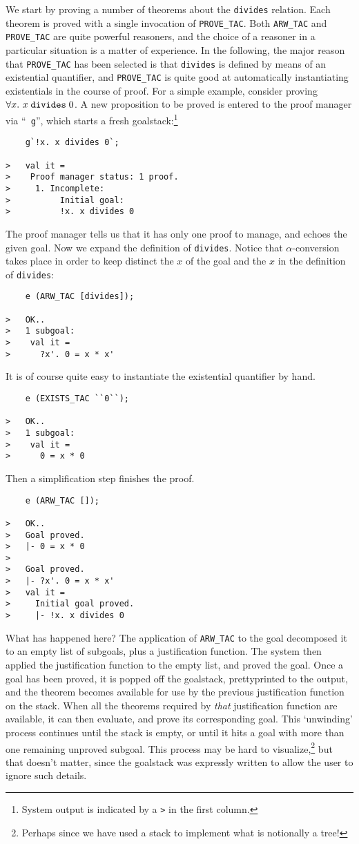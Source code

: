 We start by proving a number of theorems about the \verb+divides+
relation. Each theorem is proved with a single invocation of
\verb+PROVE_TAC+. Both 
\verb+ARW_TAC+ and \verb+PROVE_TAC+ are quite powerful reasoners, and
the choice of a reasoner in a particular situation is a matter of
experience. In the following, the major reason that \verb+PROVE_TAC+ has
been selected is that \verb+divides+ is defined by means of an existential
quantifier, and \verb+PROVE_TAC+ is quite good at automatically
instantiating existentials in the course of proof. For a simple example,
consider proving $\forall x.\ x\; \mbox{\tt divides}\; 0$. A new
proposition to be proved is entered to the proof manager via ``{\tt
g}'', which starts a fresh goalstack:\footnote{System output is indicated
by a \verb+>+ in the first column.}
{\small\begin{verbatim}
    g`!x. x divides 0`;

>   val it =
>    Proof manager status: 1 proof.
>     1. Incomplete:
>          Initial goal:
>          !x. x divides 0
\end{verbatim}}
The proof manager tells us that it has only one proof to manage, and
echoes the given goal. Now we expand the definition of
\verb+divides+. Notice that $\alpha$-conversion takes place in order to
keep distinct the $x$ of the goal and the $x$ in the definition of
\verb+divides+:
{\small\begin{verbatim}
    e (ARW_TAC [divides]);

>   OK..
>   1 subgoal:
>    val it =
>      ?x'. 0 = x * x'
\end{verbatim}}
It is of course quite easy to instantiate the existential quantifier by
hand.
{\small\begin{verbatim}
    e (EXISTS_TAC ``0``);

>   OK..
>   1 subgoal:
>    val it =
>      0 = x * 0
\end{verbatim}}

Then a simplification step finishes the proof.
{\small\begin{verbatim}
    e (ARW_TAC []);

>   OK..
>   Goal proved.
>   |- 0 = x * 0
> 
>   Goal proved.
>   |- ?x'. 0 = x * x'
>   val it =
>     Initial goal proved.
>     |- !x. x divides 0
\end{verbatim}}
What has happened here? The application of \verb+ARW_TAC+ to the goal
decomposed it to an empty list of subgoals, plus a justification
function. The system then applied the justification function to 
the empty list, and proved the goal. Once a goal has been proved, it is
popped off the goalstack, prettyprinted to the output, and the theorem
becomes available for use by the previous justification function on the
stack. When all the theorems required by {\it that\/} justification
function are available, it can then evaluate, and prove its
corresponding goal. This `unwinding' process continues until the stack
is empty, or until it hits a goal with more than one remaining unproved
subgoal. This process may be hard to visualize,\footnote{Perhaps since we
have used a stack to implement what is notionally a tree!} but that doesn't
matter, since the goalstack was expressly written to allow the user to
ignore such details. 


